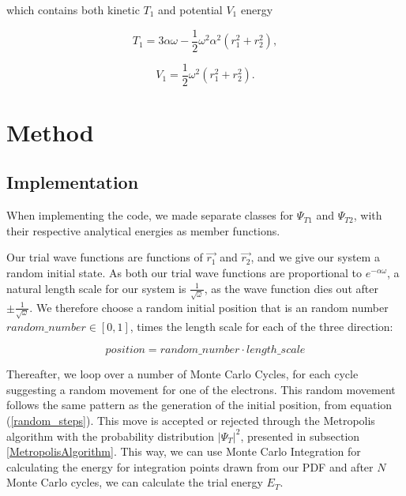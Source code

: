 \documentclass[norsk,a4paper,12pt]{article}
\begin{document}
which contains both kinetic $T_1$ and potential $V_1$ energy

\begin{equation}
T_1 = 3\alpha \omega -\frac{1}{2}\omega^2\alpha^2\left(r_1^2 + r_2^2\right),
\label{eq:T_1}
\end{equation}

\begin{equation}
V_1 = \frac{1}{2}\omega^2(r_1^2 + r_2^2).
\end{equation}

\section{Method}

\subsection{Implementation}

When implementing the code, we made separate classes for $\Psi_{T1}$ and $\Psi_{T2}$, with their respective analytical energies as member functions. \par 
\vspace{2mm}

Our trial wave functions are functions of $\vec{r_1}$ and $\vec{r_2}$, and we give our system a random initial state. As both our trial wave functions are proportional to $e^{-\alpha \omega}$, a natural length scale for our system is $\frac{1}{\sqrt{\omega}}$, as the wave function dies out after $\pm \frac{1}{\sqrt{\omega}}$. We therefore choose a random initial position that is an random number $ random\_number \in [0,1]$, times the length scale for each of the three direction:

\begin{equation}
    position =  random\_number \cdot length\_scale
    \label{random_steps}
\end{equation}

Thereafter, we loop over a number of Monte Carlo Cycles, for each cycle suggesting a random movement for one of the electrons. This random movement follows the same pattern as the generation of the initial position, from equation (\ref{random_steps}). This move is accepted or rejected through the Metropolis algorithm with the probability distribution $|\Psi_T|^2$, presented in subsection \ref{MetropolisAlgorithm}. This way, we can use Monte Carlo Integration for calculating the energy for integration points drawn from our PDF and after $N$ Monte Carlo cycles, we can calculate the trial energy $E_T$.
\end{document}
